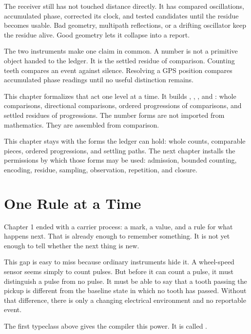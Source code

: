 The receiver still has not touched distance directly. It has compared
oscillations, accumulated phase, corrected its clock, and tested candidates
until the residue becomes usable. Bad geometry, multipath reflections, or a
drifting oscillator keep the residue alive. Good geometry lets it collapse into
a report.

The two instruments make one claim in common. A number is not a primitive
object handed to the ledger. It is the settled residue of comparison. Counting
teeth compares an event against silence. Resolving a GPS position compares
accumulated phase readings until no useful distinction remains.

This chapter formalizes that act one level at a time. It builds
, , , and : whole
comparisons, directional comparisons, ordered progressions of comparisons, and
settled residues of progressions. The number forms are not imported from
mathematics. They are assembled from comparison.

This chapter stays with the forms the ledger can hold: whole counts, comparable
pieces, ordered progressions, and settling paths. The next chapter installs the
permissions by which those forms may be used: admission, bounded counting,
encoding, residue, sampling, observation, repetition, and closure.

\section{One Rule at a Time}
\label{se:one-rule-at-a-time}

Chapter 1 ended with a carrier process: a mark, a value, and a rule for what
happens next. That is already enough to remember something. It is not yet
enough to tell whether the next thing is new.

This gap is easy to miss because ordinary instruments hide it. A wheel-speed
sensor seems simply to count pulses. But before it can count a pulse, it must
distinguish a pulse from no pulse. It must be able to say that a tooth passing
the pickup is different from the baseline state in which no tooth has passed.
Without that difference, there is only a changing electrical environment and no
reportable event.

The first typeclass above  gives the compiler this power.
It is called .

